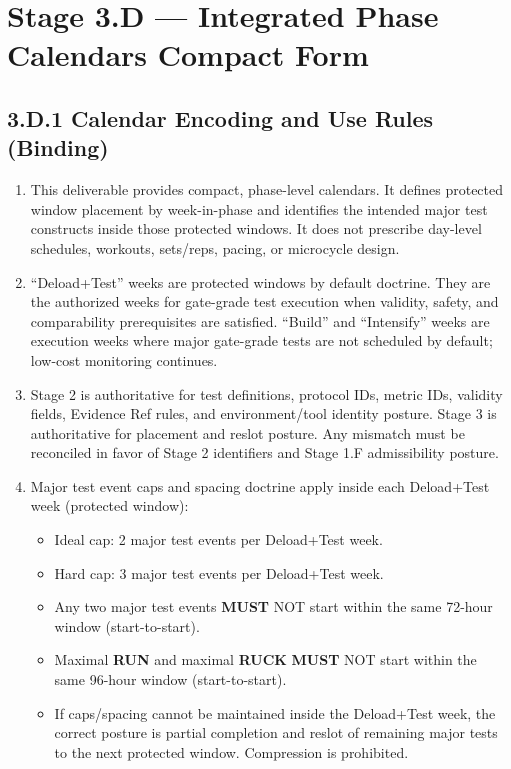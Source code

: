 \documentclass[10pt]{article}
\begin{document}
\section*{Stage 3.D — Integrated Phase Calendars Compact Form}
{}

\subsection*{3.D.1 Calendar Encoding and Use Rules (Binding)}
{}

\begin{enumerate}
\item This deliverable provides compact, phase-level calendars. It defines protected window placement by week-in-phase and identifies the intended major test constructs inside those protected windows. It does not prescribe day-level schedules, workouts, sets/reps, pacing, or microcycle design.

\item “Deload+Test” weeks are protected windows by default doctrine. They are the authorized weeks for gate-grade test execution when validity, safety, and comparability prerequisites are satisfied. “Build” and “Intensify” weeks are execution weeks where major gate-grade tests are not scheduled by default; low-cost monitoring continues.

\item Stage 2 is authoritative for test definitions, protocol IDs, metric IDs, validity fields, Evidence Ref rules, and environment/tool identity posture. Stage 3 is authoritative for placement and reslot posture. Any mismatch must be reconciled in favor of Stage 2 identifiers and Stage 1.F admissibility posture.

\item Major test event caps and spacing doctrine apply inside each Deload+Test week (protected window):
\begin{itemize}
\item Ideal cap: 2 major test events per Deload+Test week.
\item Hard cap: 3 major test events per Deload+Test week.
\item Any two major test events \textbf{MUST} NOT start within the same 72-hour window (start-to-start).
\item Maximal \textbf{RUN} and maximal \textbf{RUCK} \textbf{MUST} NOT start within the same 96-hour window (start-to-start).
\item If caps/spacing cannot be maintained inside the Deload+Test week, the correct posture is partial completion and reslot of remaining major tests to the next protected window. Compression is prohibited.
\end{itemize}


\end{enumerate}
\end{document}
